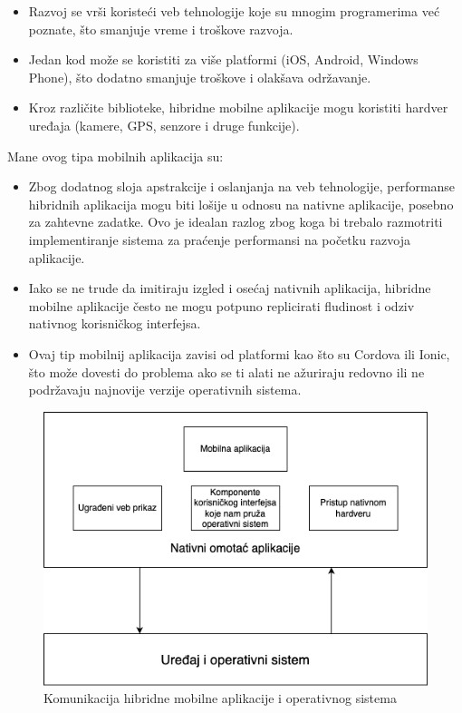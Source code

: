 \documentclass[12pt,oneside]{memoir}
\begin{document}
\begin{itemize}
    \item Razvoj se vrši koristeći veb tehnologije koje su mnogim programerima već poznate, što smanjuje vreme i troškove razvoja.
    \item Jedan kod može se koristiti za više platformi (iOS, Android, Windows Phone), što dodatno smanjuje troškove i olakšava održavanje.
    \item Kroz različite biblioteke, hibridne mobilne aplikacije mogu koristiti hardver uređaja (kamere, GPS, senzore i druge funkcije).
\end{itemize}
Mane ovog tipa mobilnih aplikacija su:
\begin{itemize}
    \item Zbog dodatnog sloja apstrakcije i oslanjanja na veb tehnologije, performanse hibridnih aplikacija mogu biti lošije u odnosu na nativne aplikacije, posebno za zahtevne zadatke. Ovo je idealan razlog zbog koga bi trebalo razmotriti implementiranje sistema za praćenje performansi na početku razvoja aplikacije.
    \item Iako se ne trude da imitiraju izgled i osećaj nativnih aplikacija, hibridne mobilne aplikacije često ne mogu potpuno replicirati fludinost i odziv nativnog korisničkog interfejsa.
    \item Ovaj tip mobilnij aplikacija zavisi od platformi kao što su Cordova ili Ionic, što može dovesti do problema ako se ti alati ne ažuriraju redovno ili ne podržavaju najnovije verzije operativnih sistema.
\end{itemize}

\begin{figure}[h]
    \centering
    \includegraphics[scale=0.5]{docs/images/chapterTwo/hibridnaMobilnaAplikacija.png}
    \caption{Komunikacija hibridne mobilne aplikacije i operativnog sistema}
    \label{fig:hibridnaMobilnaAplikacija}
\end{figure}
\end{document}
